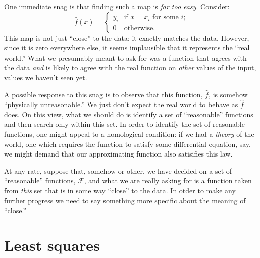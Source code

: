 \documentclass[10pt, a4paper]{article}
\begin{document}
One immediate snag is that finding such a map is \emph{far too
  easy}. Consider:
\begin{equation*}
  \hat{f}(x) =
  \begin{cases}
    y_i & \text{if $x = x_i$ for some $i$;} \\
      0 & \text{otherwise}.
  \end{cases}
\end{equation*}
This map is not just “close” to the data: it exactly matches the
data. However, since it is zero everywhere else, it seems implausible
that it represents the “real world.” What we presumably meant to ask
for was a function that agrees with the data \emph{and} is likely to
agree with the real function on \emph{other} values of the input,
values we haven't seen yet.

A possible response to this snag is to observe that this function,
$\hat{f}$, is somehow “physically unreasonable.” We just don't expect
the real world to behave as $\hat{f}$ does. On this view, what we
should do is identify a set of “reasonable” functions and then search
only within this set. In order to identify the set of reasonable
functions, one might appeal to a nomological condition: if we had a
\emph{theory} of the world, one which requires the function to satisfy
some differential equation, say, we might demand that our
approximating function also satisifies this law.

At any rate, suppose that, somehow or other, we have decided on a set
of “reasonable” functions, $\mathcal{F}$, and what we are really asking for is a
function taken from \emph{this} set that is in some way “close” to the
data. In otder to
make any further progress we need to say something more specific
about the meaning of “close.”

\section{Least squares}
\end{document}
